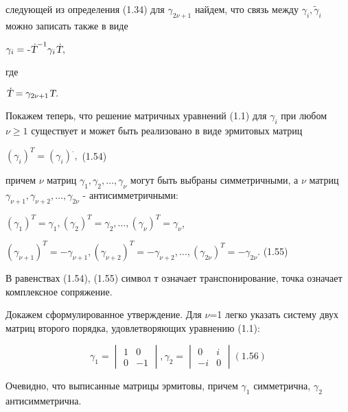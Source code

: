 \documentclass{article}
\begin{document}
{следующей из определения (1.34) для $\gamma_{2\nu+1}$ найдем, что связь между $\gamma_{i},\tilde\gamma_{i}$ можно записать также в виде\par
\begin{center}
$\gamma_{i}=\textsl{-\.T}^{-1}\gamma_{i}\textsl{\.T},$\par
\end{center}
где\par
\begin{center}
$\textsl{\.T}=\gamma_{2\nu+1}\textsl{T}.$\par
\end{center}
Покажем теперь, что решение матричных уравнений (1.1) для $\gamma_{i}$ при любом $\nu\ge1$ существует и может быть реализовано в виде эрмитовых матриц\par
\begin{center}
$(\gamma_{i})^{T}=(\gamma_{i})^{.},$        (1.54)\par
\end{center}
причем $\nu$ матриц $\gamma_1,\gamma_2,\dots,\gamma_{\nu}$ могут быть выбраны симметричными, а $\nu$ матриц $\gamma_{\nu+1},\gamma_{\nu+2},\dots,\gamma_{2\nu}$ - антисимметричными:\par
\begin{center}
$(\gamma_1)^{T}=\gamma_1, (\gamma_2)^{T}=\gamma_2,\dots, (\gamma_{\nu})^{T}=\gamma_{\nu}$,\par
$(\gamma_{\nu+1})^{T}=-\gamma_{\nu+1}, (\gamma_{\nu+2})^{T}=-\gamma_{\nu+2},\dots, (\gamma_{2\nu})^{T}=-\gamma_{2\nu}.$        (1.55)\par
\end{center}
\hspace{0.2cm}
В равенствах (1.54), (1.55) символ \glqq т \grqq означает транспонирование, точка означает комплексное сопряжение.\par
Докажем сформулированное утверждение.
Для $\nu$=1 легко указать систему двух матриц второго порядка, удовлетворяющих уравнению (1.1):\par
\begin{center}
$$
\gamma_1=\begin{vmatrix}
1 & 0\\
0 & -1
\end{vmatrix},
\gamma_2=\begin{vmatrix}
0 & i\\
-i & 0
\end{vmatrix} (1.56)
$$
\end{center}
Очевидно, что выписанные матрицы эрмитовы, причем $\gamma_1$ симметрична, $\gamma_2$ антисимметрична.\par
}
\end{document}
